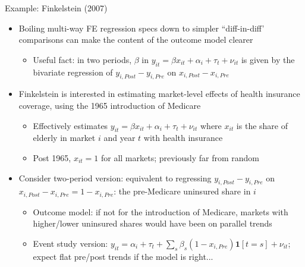 \documentclass[11pt,english]{beamer}
\begin{document}
\begin{frame}{Example: Finkelstein (2007)}

\begin{itemize}
\item Boiling multi-way FE regression specs down to simpler ``diff-in-diff' comparisons can make the content of the outcome model clearer\smallskip
\begin{itemize}
\item Useful fact: in two periods, $\beta$ in $y_{it}=\beta x_{it}+\alpha_i+\tau_t+\nu_{it}$ is given by the bivariate regression of $y_{i,Post}-y_{i,Pre}$ on $x_{i,Post}-x_{i,Pre}$
\end{itemize}\medskip\pause{}

\item Finkelstein is interested in estimating market-level effects of health insurance coverage, using the 1965 introduction of Medicare\smallskip\pause{}
\begin{itemize}
\item Effectively estimates $y_{it}=\beta x_{it}+\alpha_i+\tau_t+\nu_{it}$ where $x_{it}$ is the share of elderly in market $i$ and year $t$ with health insurance\smallskip\pause{}
\item Post 1965, $x_{it}=1$ for all markets; previously far from random
\end{itemize}\medskip\pause{}

\item Consider two-period version: equivalent to regressing $y_{i,Post}-y_{i,Pre}$ on $x_{i,Post}-x_{i,Pre}=1-x_{i,Pre}$: the pre-Medicare uninsured share in $i$\smallskip\pause{}
\begin{itemize}
\item Outcome model: if not for the introduction of Medicare, markets with higher/lower uninsured shares would have been on parallel trends\smallskip\pause{}
\item Event study version: $y_{it} = \alpha_i + \tau_t + \sum_{s} \beta_s (1-x_{i,Pre}) \mathbf{1}[t=s] + \nu_{it}$; 
expect flat pre/post trends if the model is right...
\end{itemize}
\end{itemize}

\end{frame}
\end{document}
